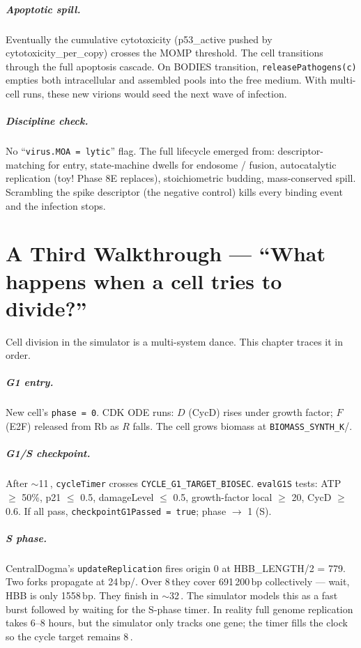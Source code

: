 \documentclass[11pt,letterpaper,twoside,openany]{book}
\newcommand{\code}[1]{\texttt{#1}}
\newcommand{\bioh}{\text{bio-h}}
\newcommand{\biosec}{\text{bio-s}}
\begin{document}
\paragraph{Apoptotic spill.} Eventually the cumulative
cytotoxicity (p53\_active pushed by cytotoxicity\_per\_copy)
crosses the MOMP threshold. The cell transitions through the full
apoptosis cascade. On BODIES transition,
\code{releasePathogens(c)} empties both intracellular and
assembled pools into the free medium. With multi-cell runs, these
new virions would seed the next wave of infection.

\paragraph{Discipline check.} No ``\code{virus.MOA = lytic}'' flag.
The full lifecycle emerged from: descriptor-matching for entry,
state-machine dwells for endosome / fusion, autocatalytic
replication (toy! Phase 8E replaces), stoichiometric budding,
mass-conserved spill. Scrambling the spike descriptor (the negative
control) kills every binding event and the infection stops.

\chapter{A Third Walkthrough --- ``What happens when a cell tries to divide?''}
\label{ch:walkthrough-divide}

Cell division in the simulator is a multi-system dance. This
chapter traces it in order.

\paragraph{G1 entry.} New cell's \code{phase = 0}. CDK ODE runs:
$D$ (CycD) rises under growth factor; $F$ (E2F) released from Rb as
$R$ falls. The cell grows biomass at
\code{BIOMASS\_SYNTH\_K}/\biosec.

\paragraph{G1/S checkpoint.} After $\sim$11\,\bioh,
\code{cycleTimer} crosses \code{CYCLE\_G1\_TARGET\_BIOSEC}.
\code{evalG1S} tests: ATP $\geq$ 50\%, p21 $\leq$ 0.5, damageLevel
$\leq$ 0.5, growth-factor local $\geq$ 20, CycD $\geq$ 0.6. If all
pass, \code{checkpointG1Passed = true}; phase $\to$ 1 (S).

\paragraph{S phase.} CentralDogma's \code{updateReplication} fires
origin 0 at HBB\_LENGTH/2 = 779. Two forks propagate at
24\,bp/\biosec. Over 8\,\bioh they cover 691\,200\,bp collectively
--- wait, HBB is only 1558\,bp. They finish in $\sim$32\,\biosec.
The simulator models this as a fast burst followed by waiting for
the S-phase timer. In reality full genome replication takes 6--8
hours, but the simulator only tracks one gene; the timer fills the
clock so the cycle target remains 8\,\bioh.
\end{document}

